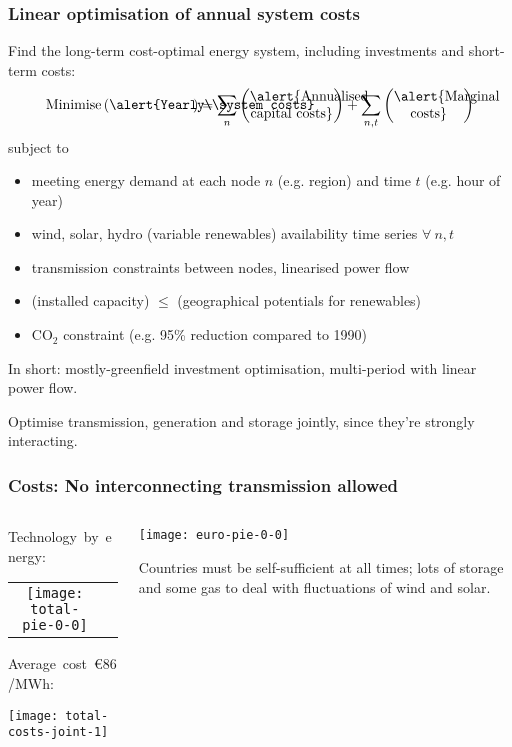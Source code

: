 \documentclass[10pt,aspectratio=169,dvipsnames]{beamer}
\let\olditem\item
\renewcommand{\item}{%
\olditem\vspace{5pt}}
\begin{document}
\begin{frame}[fragile]
  \frametitle{Linear optimisation of annual system costs}

Find the long-term cost-optimal energy system, including investments and short-term costs:
\begin{equation*}
  \textrm{Minimise} \left(\parbox{6em}{\centering\alert{Yearly\\system costs}}\right) = \sum_n \left(\parbox{6em}{\centering\alert{Annualised capital costs}}\right) + \sum_{n,t} \left(\parbox{5em}{\centering\alert{Marginal costs}}\right)
\end{equation*}
subject to
\begin{itemize}
\item meeting \alert{energy demand} at each node $n$ (e.g. region) and time $t$ (e.g. hour of year)
\item wind, solar, hydro (variable renewables) \alert{availability time series} $\forall\: n,t$
\item \alert{transmission constraints} between nodes, \alert{linearised power flow}
\item (installed capacity) $\leq$ (\alert{geographical potentials} for renewables)
\item \alert{CO${}_2$ constraint} (e.g. 95\% reduction compared to 1990)
\end{itemize}

In short: mostly-greenfield investment optimisation, multi-period with linear power flow.

Optimise transmission, generation and storage \alert{jointly}, since they're strongly interacting.
\end{frame}





\begin{frame}
  \frametitle{Costs: No interconnecting transmission allowed}



\begin{columns}[T]
  \begin{column}{4.9cm}

  Technology~by~energy:
  \begin{tabular}{cc}
    \texttt{[image: total-pie-0-0]} &
  \end{tabular}


  Average~cost~\alert{\euro 86/MWh}:

  \texttt{[image: total-costs-joint-1]}

  \end{column}

  \begin{column}{9cm}
    \centering
    \texttt{[image: euro-pie-0-0]}

    \raggedright
    Countries must be self-sufficient at all times; lots of storage and some gas to deal with fluctuations of wind and solar.
  \end{column}

\end{columns}
\end{frame}
\end{document}

